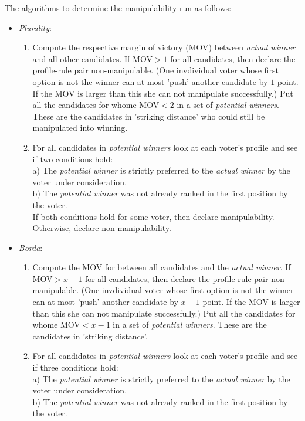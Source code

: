 \documentclass[10pt,a4paper]{article}
\begin{document}
\noindent The algorithms to determine the manipulability run as follows:\\
\begin{itemize}
\item \textit{Plurality}: \begin{enumerate}
\item  Compute the respective margin of victory (MOV) between \textit{actual winner} and all other candidates. If MOV$>1$ for all candidates, then declare the profile-rule pair non-manipulable. (One invdividual voter whose first option is not the winner can at most 'push' another candidate by $1$ point. If the MOV is larger than this she can not manipulate successfully.) Put all the candidates for whome MOV$<2$ in a set of \textit{potential winners}. These are the candidates in 'striking distance' who could still be manipulated into winning.
\item For all candidates in \textit{potential winners} look at each voter's profile and see if two conditions hold: \\
a) The \textit{potential winner} is strictly preferred to the \textit{actual winner} by the voter under consideration.\\
b) The \textit{potential winner} was not already ranked in the first position by the voter.\\
If both conditions hold for some voter, then declare manipulability. Otherwise, declare non-manipulability.
\end{enumerate}
\item \textit{Borda}: \begin{enumerate}
\item Compute the MOV for between all candidates and the \textit{actual winner}. If MOV$>x-1$ for all candidates, then declare the profile-rule pair non-manipulable. (One invdividual voter whose first option is not the winner can at most 'push' another candidate by $x-1$ point. If the MOV is larger than this she can not manipulate successfully.) Put all the candidates for whome MOV$<x-1$ in a set of \textit{potential winners}. These are the candidates in 'striking distance'.
\item For all candidates in \textit{potential winners} look at each voter's profile and see if three conditions hold: \\
a) The \textit{potential winner} is strictly preferred to the \textit{actual winner} by the voter under consideration.\\
b) The \textit{potential winner} was not already ranked in the first position by the voter.\\

\end{enumerate}
\end{itemize}
\end{document}
